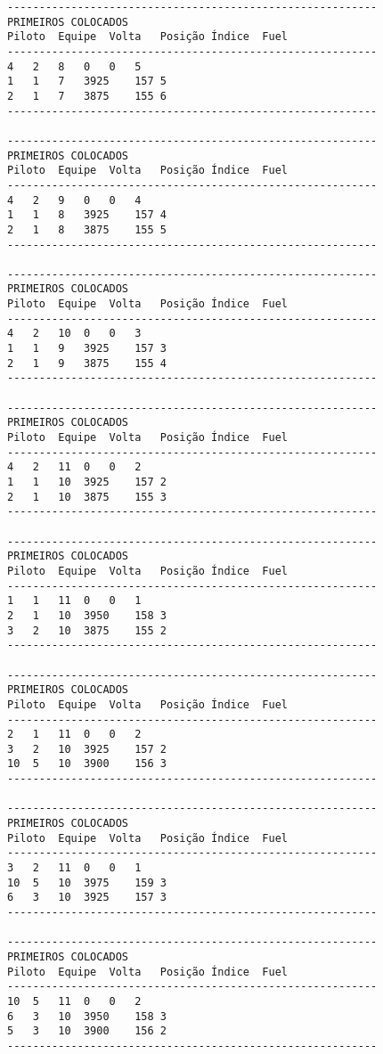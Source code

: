 \documentclass[12pt]{article}
\begin{document}
\begin{verbatim}
----------------------------------------------------------
PRIMEIROS COLOCADOS
Piloto	Equipe	Volta	Posição	Índice	Fuel
----------------------------------------------------------
4	2	8	0	0	5
1	1	7	3925	157	5
2	1	7	3875	155	6
----------------------------------------------------------

----------------------------------------------------------
PRIMEIROS COLOCADOS
Piloto	Equipe	Volta	Posição	Índice	Fuel
----------------------------------------------------------
4	2	9	0	0	4
1	1	8	3925	157	4
2	1	8	3875	155	5
----------------------------------------------------------

----------------------------------------------------------
PRIMEIROS COLOCADOS
Piloto	Equipe	Volta	Posição	Índice	Fuel
----------------------------------------------------------
4	2	10	0	0	3
1	1	9	3925	157	3
2	1	9	3875	155	4
----------------------------------------------------------

----------------------------------------------------------
PRIMEIROS COLOCADOS
Piloto	Equipe	Volta	Posição	Índice	Fuel
----------------------------------------------------------
4	2	11	0	0	2
1	1	10	3925	157	2
2	1	10	3875	155	3
----------------------------------------------------------

----------------------------------------------------------
PRIMEIROS COLOCADOS
Piloto	Equipe	Volta	Posição	Índice	Fuel
----------------------------------------------------------
1	1	11	0	0	1
2	1	10	3950	158	3
3	2	10	3875	155	2
----------------------------------------------------------

----------------------------------------------------------
PRIMEIROS COLOCADOS
Piloto	Equipe	Volta	Posição	Índice	Fuel
----------------------------------------------------------
2	1	11	0	0	2
3	2	10	3925	157	2
10	5	10	3900	156	3
----------------------------------------------------------

----------------------------------------------------------
PRIMEIROS COLOCADOS
Piloto	Equipe	Volta	Posição	Índice	Fuel
----------------------------------------------------------
3	2	11	0	0	1
10	5	10	3975	159	3
6	3	10	3925	157	3
----------------------------------------------------------

----------------------------------------------------------
PRIMEIROS COLOCADOS
Piloto	Equipe	Volta	Posição	Índice	Fuel
----------------------------------------------------------
10	5	11	0	0	2
6	3	10	3950	158	3
5	3	10	3900	156	2
----------------------------------------------------------


\end{verbatim}
\end{document}

